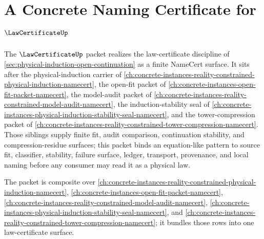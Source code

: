 \chapter{A Concrete Naming Certificate for $\LawCertificateUp$}
\label{ch:concrete-instances-law-certificate-namecert}

The $\LawCertificateUp$ packet realizes the law-certificate discipline of \autoref{sec:physical-induction-open-continuation} as a finite NameCert surface. It sits after the physical-induction carrier of \autoref{ch:concrete-instances-reality-constrained-physical-induction-namecert}, the open-fit packet of \autoref{ch:concrete-instances-open-fit-packet-namecert}, the model-audit packet of \autoref{ch:concrete-instances-reality-constrained-model-audit-namecert}, the induction-stability seal of \autoref{ch:concrete-instances-physical-induction-stability-seal-namecert}, and the tower-compression packet of \autoref{ch:concrete-instances-reality-constrained-tower-compression-namecert}. Those siblings supply finite fit, audit comparison, continuation stability, and compression-residue surfaces; this packet binds an equation-like pattern to source fit, classifier, stability, failure surface, ledger, transport, provenance, and local naming before any consumer may read it as a physical law.

The packet is composite over \autoref{ch:concrete-instances-reality-constrained-physical-induction-namecert}, \autoref{ch:concrete-instances-open-fit-packet-namecert}, \autoref{ch:concrete-instances-reality-constrained-model-audit-namecert}, \autoref{ch:concrete-instances-physical-induction-stability-seal-namecert}, and \autoref{ch:concrete-instances-reality-constrained-tower-compression-namecert}; it bundles those rows into one law-certificate surface.

